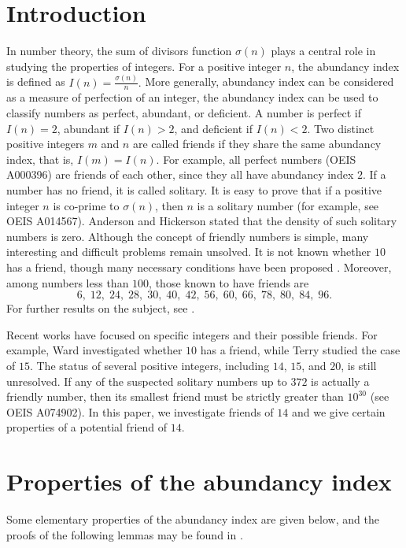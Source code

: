 \documentclass[11pt,twoside]{amsart}
\begin{document}
\section{Introduction}
In number theory, the sum of divisors function $\sigma(n)$ plays a central role in studying the properties of integers. For a positive integer $n$, the abundancy index is defined as
$I(n) = \frac{\sigma(n)}{n}.$ More generally,
abundancy index can be considered as a measure of perfection of an integer, the abundancy index can be used to classify numbers as perfect, abundant, or deficient. A number is perfect if $I(n)=2$, abundant if $I(n)>2$, and deficient if $I(n)<2$. Two distinct positive integers $m$ and $n$ are called friends if they share the same abundancy index, that is, $I(m) = I(n).$
For example, all perfect numbers (OEIS A000396) are friends of each other, since they all have abundancy index $2$. If a number has no friend, it is called solitary. It is easy to prove \cite{1} that if a positive integer $n$ is co-prime to $\sigma(n)$, then $n$ is a solitary number (for example, see OEIS A014567). Anderson and Hickerson \cite{1} stated that the density of such solitary numbers is zero.  Although the concept of friendly numbers is simple, many interesting and difficult problems remain unsolved. It is not known whether $10$ has a friend, though many necessary conditions have been proposed \cite{4,5,7,8}. Moreover, among numbers less than $100$, those known to have friends are
$$6, \;12, \;24,\; 28,\; 30,\; 40,\; 42,\; 56,\; 60,\; 66,\; 78,\; 80,\; 84,\; 96.$$
For further results on the subject, see \cite{1,2,3,9}.

Recent works have focused on specific integers and their possible friends. For example, Ward \cite{8} investigated whether $10$ has a friend, while Terry \cite{6} studied the case of $15$. The status of several positive integers, including $14$, $15$, and $20$, is still unresolved. If any of the suspected solitary numbers up to $372$ is actually a friendly number, then its smallest friend must be strictly greater than $10^{30}$ (see OEIS A074902). In this paper, we investigate friends of $14$ and we give certain properties of a potential friend of $14$.

\section{Properties of the abundancy index}
Some  elementary properties of the abundancy index are given below, and the proofs of the following lemmas may be found in \cite{3,9}. 
\end{document}
